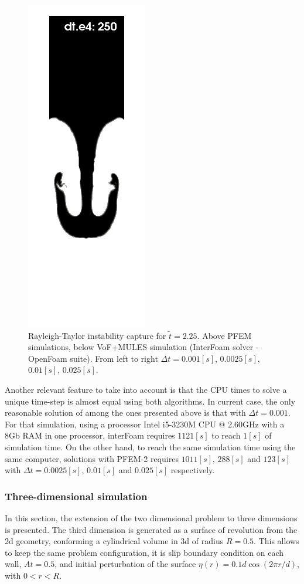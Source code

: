 \begin{figure}[htbp]
\begin{center}
      \includegraphics[width=.24\columnwidth]{images/rayleigh_pfem_dts_D.jpg}
      
  \end{center}
  \caption{\label{fg:rayleigh-comparison-dts} Rayleigh-Taylor instability capture for $\widetilde{t}=2.25$. Above PFEM simulations, below VoF+MULES simulation (InterFoam solver - OpenFoam suite). From left to right $\Delta t =0.001[s]$, $0.0025[s]$, $0.01[s]$, $0.025[s]$.}
\end{figure}

Another relevant feature to take into account is that the CPU times to solve a unique time-step is almost equal using both algorithms.
In current case,  the only reasonable solution of \OF among the ones presented above is that with $\Delta t=0.001$. For that simulation, using a processor Intel i5-3230M CPU @ 2.60GHz with a 8Gb RAM in one processor, interFoam requires $1121[s]$ to reach $1[s]$ of simulation time. On the other hand, to reach the same simulation time using the same computer, solutions with PFEM-2 requires $1011[s]$, $288[s]$ and $123[s]$ with $\Delta t=0.0025[s]$, $0.01[s]$ and $0.025[s]$ respectively.


\subsubsection{Three-dimensional simulation}

In this section, the extension of the two dimensional problem to three dimensions is presented. The third dimension is generated as a surface of revolution from the 2d geometry, conforming a cylindrical volume in 3d of radius $R=0.5$. This allows to keep the same problem configuration, it is slip boundary condition on each wall, $At=0.5$, and initial perturbation of the surface $\eta(r) = 0.1d \cos(2\pi r/d)$, with $0<r<R$.

